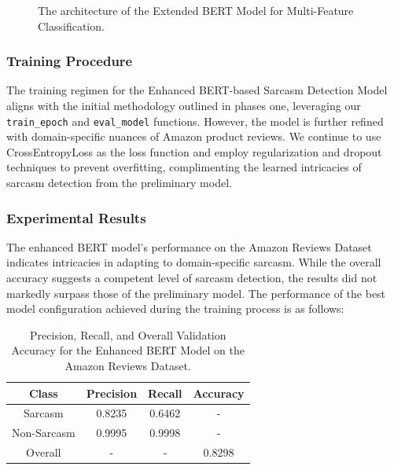 \documentclass[10pt,twocolumn,letterpaper]{article}
\begin{document}
\begin{figure}[ht]
    \centering
    \caption{The architecture of the Extended BERT Model for Multi-Feature Classification.}
    \label{fig:model_architecture}
\end{figure}

\subsubsection{Training Procedure}
The training regimen for the Enhanced BERT-based Sarcasm Detection Model aligns with the initial methodology outlined in phases one, leveraging our \texttt{train\_epoch} and \texttt{eval\_model} functions. However, the model is further refined with domain-specific nuances of Amazon product reviews. We continue to use CrossEntropyLoss as the loss function and employ regularization and dropout techniques to prevent overfitting, complimenting the learned intricacies of sarcasm detection from the preliminary model.

\subsubsection{Experimental Results}
\label{sec:experimental_results}

The enhanced BERT model's performance on the Amazon Reviews Dataset indicates intricacies in adapting to domain-specific sarcasm. While the overall accuracy suggests a competent level of sarcasm detection, the results did not markedly surpass those of the preliminary model. The performance of the best model configuration achieved during the training process is as follows:

\begin{table}[H]  
    \centering  
    \begin{tabular}{|c|c|c|c|}  
        \hline  
        Class & Precision & Recall & Accuracy \\  
        \hline  
        Sarcasm & 0.8235 & 0.6462 & - \\  
        \hline  
        Non-Sarcasm & 0.9995 & 0.9998 & - \\  
        \hline  
        Overall & - & - & 0.8298 \\  
        \hline  
    \end{tabular}  
    \caption{Precision, Recall, and Overall Validation Accuracy for the Enhanced BERT Model on the Amazon Reviews Dataset.}  
    \label{tab:best_model_results}
\end{table}
\end{document}
